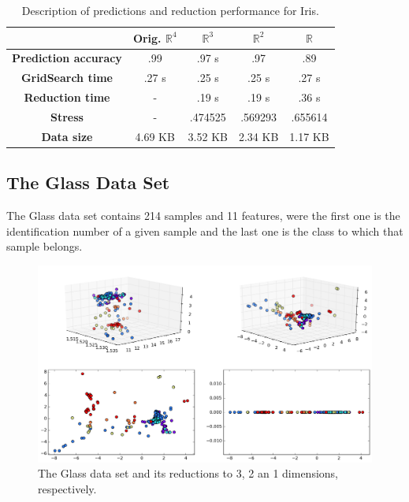 \documentclass[12pt]{report}
\begin{document}
\begin{table}[H]
	\centering
	\begin{tabular}{|c|c|c|c|c|}
		\hline
		& \textbf{Orig. $\mathbb{R}^4$} & \textbf{$\mathbb{R}^3$} & \textbf{$\mathbb{R}^2$} & \textbf{$\mathbb{R}$} \\\hline
		\textbf{Prediction accuracy}   & .99      & .97  s             & .97             & .89           \\\hline
		\textbf{GridSearch time}           & .27 s   & .25 s              & .25 s         & .27 s        \\\hline
		\textbf{Reduction time}             & -           & .19 s              & .19 s          & .36 s        \\\hline
		\textbf{Stress}                                  & -           & .474525      & .569293   & .655614 \\\hline
		\textbf{Data size}                           & 4.69 KB & 3.52 KB  & 2.34 KB   & 1.17 KB  \\\hline
	\end{tabular}

	\caption{Description of predictions and reduction performance for Iris.}
\end{table}

\newpage
\subsection{The Glass Data Set}

The Glass data set contains 214 samples and 11 features, were the first one is the identification number of a given sample and the last one is the class to which that sample belongs.

\begin{figure}[H]
	\centering
	\includegraphics[width=\linewidth]{experiments/iso_glass}
	\captionsetup{justification=centering}
	\caption{The Glass data set and its reductions to 3, 2 an 1 dimensions, respectively.}
\end{figure}
\end{document}
